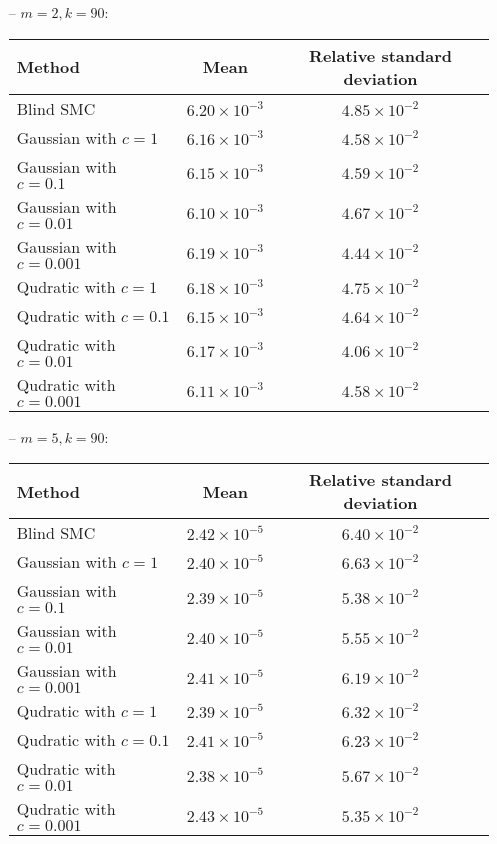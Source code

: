 \documentclass{article}
\begin{document}
\begin{itemize}
\item[--] $m = 2, k = 90$: 
\begin{center}
\begin{tabular}{| l | c | c | }
\hline
Method & Mean & Relative standard deviation \\ \hline
Blind SMC & $ 6.20 \times 10^{-3} $ & $ 4.85 \times 10^{-2} $ \\ 
Gaussian with $c = 1$ & $6.16 \times 10^{-3}$ & $ 4.58 \times 10^{-2} $ \\ 
Gaussian with $c = 0.1$ &  $6.15 \times 10^{-3}$ & $ 4.59  \times 10^{-2} $ \\ 
Gaussian with $c = 0.01$ & $6.10 \times 10^{-3}$   & $ 4.67  \times 10^{-2} $ \\
Gaussian with $c = 0.001$ &  $6.19 \times 10^{-3} $ & $ 4.44 \times 10^{-2} $ \\ 
Qudratic with $c = 1$ &  $6.18 \times 10^{-3}$  & $ 4.75 \times 10^{-2} $ \\ 
Qudratic with $c = 0.1$ & $ 6.15 \times 10^{-3}$  & $ 4.64 \times 10^{-2} $ \\
Qudratic with $c = 0.01$ & $6.17 \times 10^{-3}$   & $ 4.06  \times 10^{-2} $ \\ 
Qudratic with $c = 0.001$ &  $6.11 \times 10^{-3}$  & $ 4.58  \times 10^{-2} $ \\ \hline
\end{tabular} \end{center}

\item[--] $m = 5, k = 90$:
\begin{center}
\begin{tabular}{| l | c | c | }
\hline
Method & Mean & Relative standard deviation \\ \hline
Blind SMC & $ 2.42 \times 10^{-5} $ & $ 6.40 \times 10^{-2} $ \\ 
Gaussian with $c = 1$ & $ 2.40 \times 10^{-5}$ & $ 6.63 \times 10^{-2} $ \\ 
Gaussian with $c = 0.1$ &  $2.39 \times 10^{-5}$ & $ 5.38  \times 10^{-2} $ \\ 
Gaussian with $c = 0.01$ & $2.40 \times 10^{-5}$   & $ 5.55  \times 10^{-2} $ \\
Gaussian with $c = 0.001$ &  $2.41 \times 10^{-5} $ & $ 6.19 \times 10^{-2} $ \\ 
Qudratic with $c = 1$ &  $2.39 \times 10^{-5}$  & $ 6.32 \times 10^{-2} $ \\ 
Qudratic with $c = 0.1$ & $ 2.41 \times 10^{-5}$  & $ 6.23 \times 10^{-2} $ \\
Qudratic with $c = 0.01$ & $2.38 \times 10^{-5}$   & $ 5.67  \times 10^{-2} $ \\ 
Qudratic with $c = 0.001$ &  $2.43 \times 10^{-5}$  & $ 5.35  \times 10^{-2} $ \\ \hline
\end{tabular} \end{center}


\end{itemize}
\end{document}

